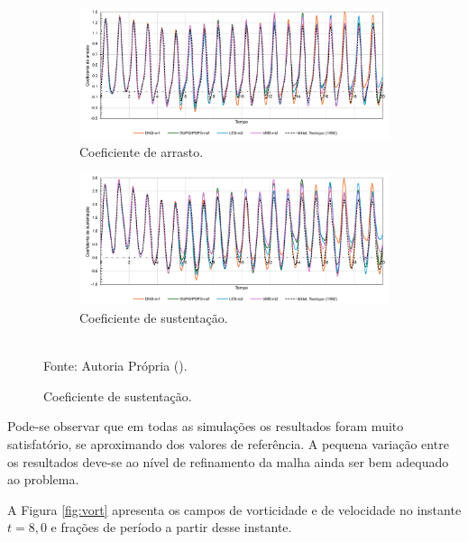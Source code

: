 \begin{figure}[h!]
    \centering
    \caption{Aerofólio com movimento de arfagem - Evolução temporal de $C_D$ e $C_L$.}
    \begin{subfigure}{\linewidth}
        \includegraphics[width=\linewidth]{Figuras/rotating-airfoil/Cd.pdf}
        \caption{Coeficiente de arrasto.}
    \end{subfigure}
    \begin{subfigure}{\linewidth}
        \includegraphics[width=\linewidth]{Figuras/rotating-airfoil/Cl.pdf}
        \caption{Coeficiente de sustentação.}
    \end{subfigure}
    \\Fonte: Autoria Própria (\the\year).
    \label{fig:rotating-airfoil-Coef}
\end{figure}

Pode-se observar que em todas as simulações os resultados foram muito satisfatório, se aproximando dos valores de referência. A pequena variação entre os resultados deve-se ao nível de refinamento da malha ainda ser bem adequado ao problema.

A Figura \ref{fig:vort} apresenta os campos de vorticidade e de velocidade no instante $t=8,0$ e frações de período a partir desse instante.

